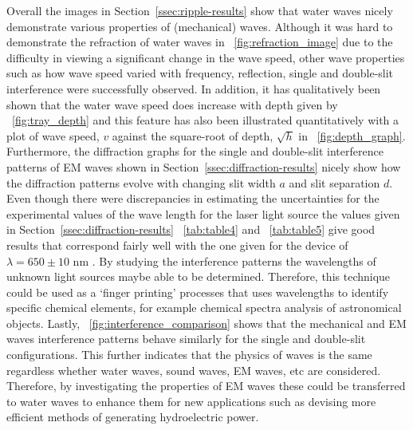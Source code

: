\documentclass{article}
\newcommand{\figref}[2][\figurename~]{#1\ref{#2}}
\newcommand{\tabref}[2][\tablename~]{#1\ref{#2}}
\newcommand{\secref}[2][Section~]{#1\ref{#2}}
\begin{document}
Overall the images in \secref{ssec:ripple-results} show that water waves nicely demonstrate various properties of (mechanical) waves. Although it was hard to demonstrate the refraction of water waves in \figref{fig:refraction_image} due to the difficulty in viewing a significant change in the wave speed, other wave properties such as how wave speed varied with frequency, reflection, single and double-slit interference were successfully observed. In addition, it has qualitatively been shown that the water wave speed does increase with depth given by \figref{fig:tray_depth} and this feature has also been illustrated quantitatively with a plot of wave speed, $v$ against the square-root of depth, $\sqrt{h}$ in \figref{fig:depth_graph}. Furthermore, the diffraction graphs for the single and double-slit interference patterns of EM waves shown in \secref{ssec:diffraction-results} nicely show how the diffraction patterns evolve with changing slit width $a$ and slit separation $d$. Even though there were discrepancies in estimating the uncertainties for the experimental values of the wave length for the laser light source the values given in \secref{ssec:diffraction-results} \tabref{tab:table4} and \tabref{tab:table5} give good results that correspond fairly well with the one given for the device of $\lambda = 650 \pm 10$ nm \cite{Web02}. By studying the interference patterns the wavelengths of unknown light sources maybe able to be determined. Therefore, this technique could be used as a `finger printing' processes that uses wavelengths to identify specific chemical elements, for example chemical spectra analysis of astronomical objects. Lastly, \figref{fig:interference_comparison} shows that the mechanical and EM waves interference patterns behave similarly for the single and double-slit configurations. This further indicates that the physics of waves is the same regardless whether water waves, sound waves, EM waves, etc are considered. Therefore, by investigating the properties of EM waves these could be transferred to water waves to enhance them for new applications such as devising more efficient methods of generating hydroelectric power.
\end{document}
